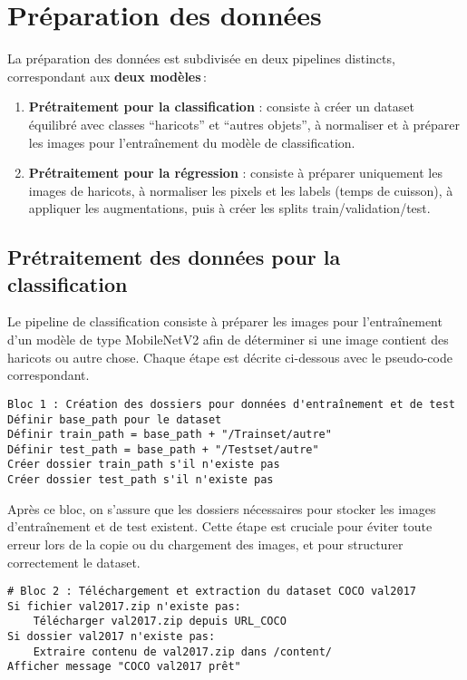 \section{Préparation des données}
\label{sec:pretraitement}

La préparation des données est subdivisée en deux pipelines distincts, correspondant aux \textbf{deux modèles} :

\begin{enumerate}
	\item \textbf{Prétraitement pour la classification} : consiste à créer un dataset équilibré avec classes “haricots” et “autres objets”, à normaliser et à préparer les images pour l’entraînement du modèle de classification.
	\item \textbf{Prétraitement pour la régression} : consiste à préparer uniquement les images de haricots, à normaliser les pixels et les labels (temps de cuisson), à appliquer les augmentations, puis à créer les splits train/validation/test.
\end{enumerate}

\subsection{Prétraitement des données pour la classification}

Le pipeline de classification consiste à préparer les images pour l'entraînement d'un modèle de type MobileNetV2 afin de déterminer si une image contient des haricots ou autre chose. Chaque étape est décrite ci-dessous avec le pseudo-code correspondant.

\begin{verbatim}
Bloc 1 : Création des dossiers pour données d'entraînement et de test
Définir base_path pour le dataset
Définir train_path = base_path + "/Trainset/autre"
Définir test_path = base_path + "/Testset/autre"
Créer dossier train_path s'il n'existe pas
Créer dossier test_path s'il n'existe pas
\end{verbatim}

Après ce bloc, on s'assure que les dossiers nécessaires pour stocker les images d'entraînement et de test existent. Cette étape est cruciale pour éviter toute erreur lors de la copie ou du chargement des images, et pour structurer correctement le dataset.

\begin{verbatim}
# Bloc 2 : Téléchargement et extraction du dataset COCO val2017
Si fichier val2017.zip n'existe pas:
    Télécharger val2017.zip depuis URL_COCO
Si dossier val2017 n'existe pas:
    Extraire contenu de val2017.zip dans /content/
Afficher message "COCO val2017 prêt"
\end{verbatim}

